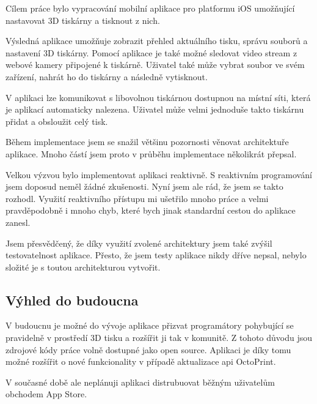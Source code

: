 Cílem práce bylo vypracování mobilní aplikace pro platformu iOS umožňující nastavovat 3D tiskárny a tisknout z nich.

Výsledná aplikace umožňuje zobrazit přehled aktuálního tisku, správu souborů a nastavení 3D tiskárny.
Pomocí aplikace je také možné sledovat video stream z webové kamery připojené k tiskárně.
Uživatel také může vybrat soubor ve svém zařízení, nahrát ho do tiskárny a následně vytisknout.

V aplikaci lze komunikovat s libovolnou tiskárnou dostupnou na místní síti, která je aplikací automaticky nalezena.
Uživatel může velmi jednoduše takto tiskárnu přidat a obsloužit celý tisk.

\bigskip

Během implementace jsem se snažil většinu pozornosti věnovat architektuře aplikace.
Mnoho částí jsem proto v průběhu implementace několikrát přepsal.

Velkou výzvou bylo implementovat aplikaci reaktivně.
S reaktivním programování jsem doposud neměl žádné zkušenosti.
Nyní jsem ale rád, že jsem se takto rozhodl.
Využití reaktivního přístupu mi ušetřilo mnoho práce a velmi pravděpodobně i mnoho chyb, které bych jinak standardní cestou do aplikace zanesl.

\bigskip

Jsem přesvědčený, že díky využití zvolené architektury jsem také zvýšil testovatelnost aplikace.
Přesto, že jsem testy aplikace nikdy dříve nepsal, nebylo složité je s toutou architekturou vytvořit.

\subsection*{Výhled do budoucna}

V budoucnu je možné do vývoje aplikace přizvat programátory pohybující se pravidelně v prostředí 3D tisku a rozšířit ji tak v komunitě.
Z tohoto důvodu jsou zdrojové kódy práce volně dostupné jako open source.
Aplikaci je díky tomu možné rozšířit o nové funkcionality v případě aktualizace \acrshort{api} OctoPrint.

V současné době ale neplánuji aplikaci distrubuovat běžným uživatelům obchodem App Store.

